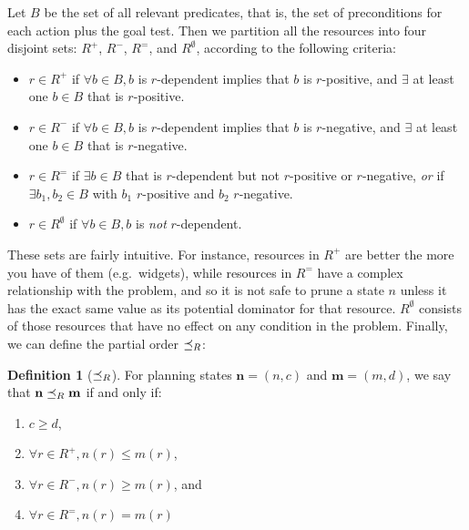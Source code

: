 \documentclass[letterpaper]{article}
\theoremstyle{plain} \newtheorem{theorem}{Theorem} \newtheorem{proposition}{Proposition} \newtheorem{lemma}{Lemma}
\theoremstyle{definition} \newtheorem{definition}{Definition} \newtheorem{conjecture}{Conjecture} \newtheorem*{example}{Example}
\theoremstyle{remark} \newtheorem*{remark}{Remark} \newtheorem*{note}{Note} \newtheorem{case}{Case}
\begin{document}
Let $B$ be the set of all relevant predicates, that is, the set of preconditions for each action plus the goal test. Then we partition all the resources into four disjoint sets: $R^+$, $R^-$, $R^=$, and $R^\emptyset$, according to the following criteria:
\begin{itemize}
	\item $r \in R^+$ if $\forall b \in B, b$ is $r$-dependent implies that $b$ is $r$-positive, and $\exists$ at least one $b \in B$ that is $r$-positive.
	\item $r \in R^-$ if $\forall b \in B, b$ is $r$-dependent implies that $b$ is $r$-negative, and $\exists$ at least one $b \in B$ that is $r$-negative.
	\item $r \in R^=$ if $\exists b \in B$ that is $r$-dependent but not $r$-positive or $r$-negative, \emph{or} if $\exists b_1, b_2 \in B$ with $b_1$ $r$-positive and $b_2$ $r$-negative.
	\item $r \in R^\emptyset$ if $\forall b \in B, b$ is \emph{not} $r$-dependent.
\end{itemize}

These sets are fairly intuitive. For instance, resources in
$R^+$ are better the more you have of them (e.g.\ widgets),
while resources in $R^=$ have a complex relationship with
the problem, and so it is not safe to prune a state $n$ unless
it has the exact same value as its potential dominator for that
resource.  $R^\emptyset$ consists of those resources that
have no effect on any condition in the problem. Finally, we can define the partial order $\preceq_R$:

\begin{definition}[$\preceq_R$]
	\label{def-po}
	For planning states $\mathbf{n} = (n, c)$ and $\mathbf{m} = (m, d)$, we say that $\mathbf{n} \preceq_R \mathbf{m}$ if and only if:
	\begin{enumerate}
		\item $c \ge d$,
		\item $\forall r \in R^+, n(r) \le m(r)$,
		\item $\forall r \in R^-, n(r) \ge m(r)$, and
		\item $\forall r \in R^=, n(r) = m(r)$
	\end{enumerate}
\end{definition}
\end{document}
